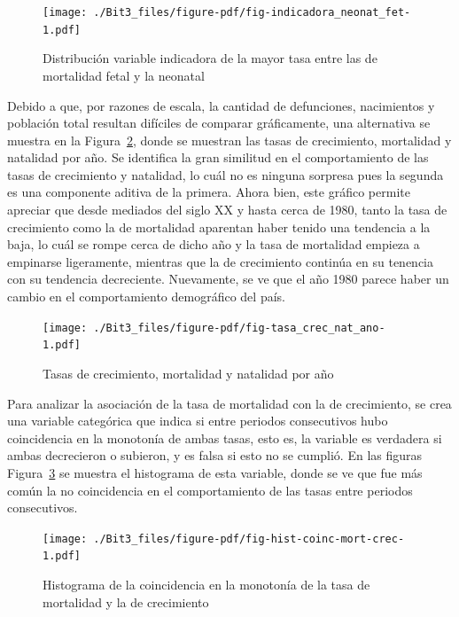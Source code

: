 \documentclass[
  letterpaper,
  onepage,
  openany]{report}
\begin{document}
\begin{figure}[H]

{\centering \texttt{[image: ./Bit3\_files/figure-pdf/fig-indicadora\_neonat\_fet-1.pdf]}

}

\caption{\label{fig-indicadora_neonat_fet}Distribución variable
indicadora de la mayor tasa entre las de mortalidad fetal y la neonatal}

\end{figure}

Debido a que, por razones de escala, la cantidad de defunciones,
nacimientos y población total resultan difíciles de comparar
gráficamente, una alternativa se muestra en la
Figura~\ref{fig-tasa_crec_nat_ano}, donde se muestran las tasas de
crecimiento, mortalidad y natalidad por año. Se identifica la gran
similitud en el comportamiento de las tasas de crecimiento y natalidad,
lo cuál no es ninguna sorpresa pues la segunda es una componente aditiva
de la primera. Ahora bien, este gráfico permite apreciar que desde
mediados del siglo XX y hasta cerca de 1980, tanto la tasa de
crecimiento como la de mortalidad aparentan haber tenido una tendencia a
la baja, lo cuál se rompe cerca de dicho año y la tasa de mortalidad
empieza a empinarse ligeramente, mientras que la de crecimiento continúa
en su tenencia con su tendencia decreciente. Nuevamente, se ve que el
año 1980 parece haber un cambio en el comportamiento demográfico del
país.

\begin{figure}[H]

{\centering \texttt{[image: ./Bit3\_files/figure-pdf/fig-tasa\_crec\_nat\_ano-1.pdf]}

}

\caption{\label{fig-tasa_crec_nat_ano}Tasas de crecimiento, mortalidad y
natalidad por año}

\end{figure}

Para analizar la asociación de la tasa de mortalidad con la de
crecimiento, se crea una variable categórica que indica si entre
periodos consecutivos hubo coincidencia en la monotonía de ambas tasas,
esto es, la variable es verdadera si ambas decrecieron o subieron, y es
falsa si esto no se cumplió. En las figuras
Figura~\ref{fig-hist-coinc-mort-crec} se muestra el histograma de esta
variable, donde se ve que fue más común la no coincidencia en el
comportamiento de las tasas entre periodos consecutivos.

\begin{figure}[H]

{\centering \texttt{[image: ./Bit3\_files/figure-pdf/fig-hist-coinc-mort-crec-1.pdf]}

}

\caption{\label{fig-hist-coinc-mort-crec}Histograma de la coincidencia
en la monotonía de la tasa de mortalidad y la de crecimiento}

\end{figure}
\end{document}
